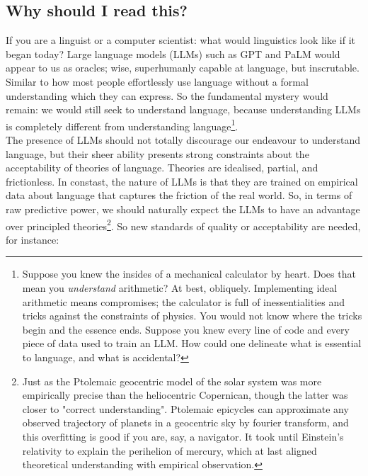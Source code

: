 \subsection{Why should I read this?}
If you are a linguist or a computer scientist: what would linguistics look like if it began today?
Large language models (LLMs) such as GPT and PaLM would appear to us as oracles;
wise, superhumanly capable at language, but inscrutable.
Similar to how most people effortlessly use language without a formal understanding which they can express.
So the fundamental mystery would remain: we would still seek to understand language, because understanding LLMs is completely different from understanding language\footnote{
Suppose you knew the insides of a mechanical calculator by heart.
Does that mean you \emph{understand} arithmetic?
At best, obliquely.
Implementing ideal arithmetic means compromises;
the calculator is full of inessentialities and tricks against the constraints of physics.
You would not know where the tricks begin and the essence ends.
Suppose you knew every line of code and every piece of data used to train an LLM.
How could one delineate what is essential to language, and what is accidental?}.\\

The presence of LLMs should not totally discourage our endeavour to understand language, but their sheer ability presents strong constraints about the acceptability of theories of language. Theories are idealised, partial, and frictionless. In constast, the nature of LLMs is that they are trained on empirical data about language that captures the friction of the real world. So, in terms of raw predictive power, we should naturally expect the LLMs to have an advantage over principled theories\footnote{Just as the Ptolemaic geocentric model of the solar system was more empirically precise than the heliocentric Copernican, though the latter was closer to "correct understanding". Ptolemaic epicycles can approximate any observed trajectory of planets in a geocentric sky by fourier transform, and this overfitting is good if you are, say, a navigator. It took until Einstein's relativity to explain the perihelion of mercury, which at last aligned theoretical understanding with empirical observation.}. So new standards of quality or acceptability are needed, for instance:

